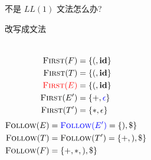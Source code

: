 
\begin{frame}{}
  \begin{center}
    不是 $LL(1)$ 文法怎么办?

    \pause
    \vspace{0.60cm}

    \pause
    \vspace{0.80cm}

    \vspace{0.30cm}
  \end{center}
\end{frame}

\begin{frame}{}
  \begin{center}
    
    

  \end{center}
\end{frame}

\begin{frame}{}
  \begin{center}
    改写成文法 
    \begin{columns}
        
    \end{columns}

    \vspace{-0.30cm}
    \begin{columns}
        \pause
        \begin{align*}
          \textsc{First}(F) &= \{(, \text{\bf id}\} \\
          \textsc{First}(T) &= \{(, \text{\bf id}\} \\
          \textcolor{red}{\textsc{First}(E)} &= \{(, \text{\bf id}\} \\
          \textsc{First}(E') &= \{+, \textcolor{blue}{\epsilon}\} \\
          \textsc{First}(T') &= \{\ast, \epsilon\}
        \end{align*}
        \begin{align*}
          \textsc{Follow}(E) &= \textcolor{blue}{\textsc{Follow}(E')} = \{), \$\} \\
          \textsc{Follow}(T) &= \textsc{Follow}(T') = \{+, ), \$\} \\
          \textsc{Follow}(F) &= \{+, \ast, ), \$\}
        \end{align*}
    \end{columns}
  \end{center}
\end{frame}

